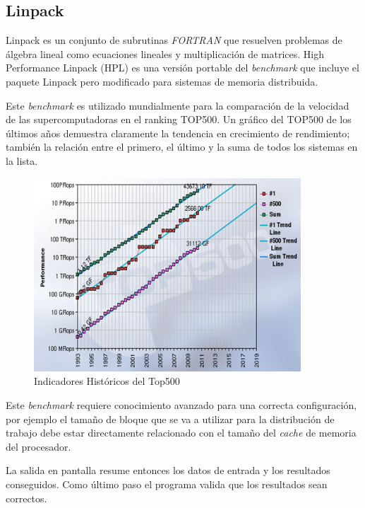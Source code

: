 \documentclass[a4paper]{report}
\begin{document}
\subsection{Linpack}

Linpack \cite{linpack} es un conjunto de subrutinas {\it FORTRAN} que resuelven
problemas de álgebra lineal como ecuaciones lineales y multiplicación de
matrices. High Performance Linpack (HPL) \cite{hpl} es una versión portable del {\it benchmark} que incluye
el paquete Linpack pero modificado para sistemas de memoria distribuida.

\bigskip

Este {\it benchmark} es utilizado mundialmente para la comparación de la
velocidad de las supercomputadoras en el ranking TOP500. 
Un gráfico del TOP500 de los últimos años demuestra claramente la
tendencia en crecimiento de rendimiento; también la relación entre el primero,
el último y la suma de todos los sistemas en la lista.

\begin{figure}[H]
\begin{center}
\includegraphics[width=10cm]{top500.png}
\caption{Indicadores Históricos del Top500}
\end{center}
\end{figure}

Este {\it benchmark} requiere conocimiento avanzado para una correcta configuración,
por ejemplo el tamaño de bloque que se va a utilizar para la distribución de trabajo
debe estar directamente relacionado con el tamaño del {\it cache} de memoria del procesador.

\bigskip

La salida en pantalla resume entonces los datos de entrada y los resultados conseguidos.
Como último paso el programa valida que los resultados sean correctos.
\end{document}
